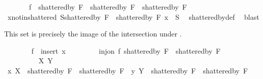 \begin{isabellebody}
\ \ \ \ \ \ \ f\ {\isacharbackquote}{\kern0pt}\ {\isacharparenleft}{\kern0pt}shattered{\isacharunderscore}{\kern0pt}by\ {\isacharquery}{\kern0pt}F{}\ {\isasyminter}\ shattered{\isacharunderscore}{\kern0pt}by\ {\isacharquery}{\kern0pt}F{}{\isacharparenright}{\kern0pt}\ {\isasymsubseteq}\ shattered{\isacharunderscore}{\kern0pt}by\ F{\isachardoublequoteclose}\isanewline
\ \ \ \ \isamarkupfalse%
\isanewline
\ \ \ \ \ \ \isamarkupfalse%
\ x{\isacharunderscore}{\kern0pt}not{\isacharunderscore}{\kern0pt}in{\isacharunderscore}{\kern0pt}shattered{\isacharcolon}{\kern0pt}\ {\isachardoublequoteopen}{\isasymforall}S{\isasymin}{\isacharparenleft}{\kern0pt}shattered{\isacharunderscore}{\kern0pt}by\ {\isacharquery}{\kern0pt}F{}{\isacharparenright}{\kern0pt}\ {\isasymunion}\ {\isacharparenleft}{\kern0pt}shattered{\isacharunderscore}{\kern0pt}by\ {\isacharquery}{\kern0pt}F{}{\isacharparenright}{\kern0pt}{\isachardot}{\kern0pt}\ x\ {\isasymnotin}\ S{\isachardoublequoteclose}\ \isamarkupfalse%
\ shattered{\isacharunderscore}{\kern0pt}by{\isacharunderscore}{\kern0pt}def\ \isamarkupfalse%
\ blast%
\begin{isamarkuptext}%
This set is precisely the image of the intersection under .%
\end{isamarkuptext}\isamarkuptrue%
\ \ \ \ \ \ \isamarkupfalse%
\ {\isacharquery}{\kern0pt}f\ {\isacharequal}{\kern0pt}\ {\isachardoublequoteopen}insert\ x{\isachardoublequoteclose}\isanewline
\ \ \ \ \ \ \isamarkupfalse%
\ {}{\isacharcolon}{\kern0pt}\ {\isachardoublequoteopen}inj{\isacharunderscore}{\kern0pt}on\ {\isacharquery}{\kern0pt}f\ {\isacharparenleft}{\kern0pt}shattered{\isacharunderscore}{\kern0pt}by\ {\isacharquery}{\kern0pt}F{}\ {\isasyminter}\ shattered{\isacharunderscore}{\kern0pt}by\ {\isacharquery}{\kern0pt}F{}{\isacharparenright}{\kern0pt}{\isachardoublequoteclose}\isanewline
\ \ \ \ \ \ \isamarkupfalse%
\isanewline
\ \ \ \ \ \ \ \ \isamarkupfalse%
\ X\ Y\isanewline
\ \ \ \ \ \ \ \ \isamarkupfalse%
\ x{}{\isacharcolon}{\kern0pt}\ {\isachardoublequoteopen}X\ {\isasymin}\ {\isacharparenleft}{\kern0pt}shattered{\isacharunderscore}{\kern0pt}by\ {\isacharquery}{\kern0pt}F{}\ {\isasyminter}\ shattered{\isacharunderscore}{\kern0pt}by\ {\isacharquery}{\kern0pt}F{}{\isacharparenright}{\kern0pt}{\isachardoublequoteclose}\ \ y{}{\isacharcolon}{\kern0pt}\ {\isachardoublequoteopen}Y\ {\isasymin}\ {\isacharparenleft}{\kern0pt}shattered{\isacharunderscore}{\kern0pt}by\ {\isacharquery}{\kern0pt}F{}\ {\isasyminter}\ shattered{\isacharunderscore}{\kern0pt}by\ {\isacharquery}{\kern0pt}F{}{\isacharparenright}{\kern0pt}{\isachardoublequoteclose}\isanewline

\end{isabellebody}
